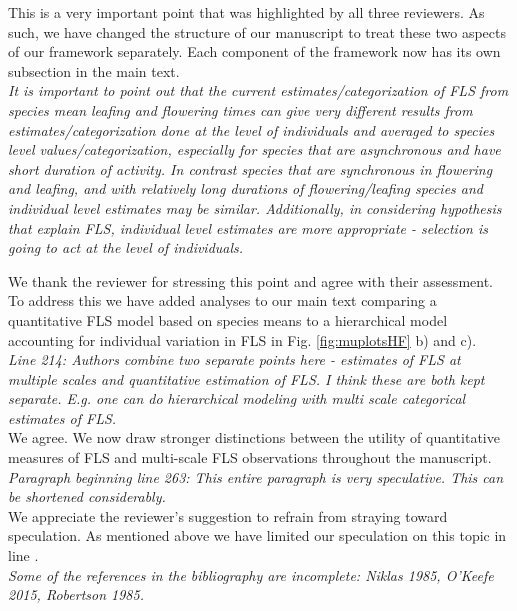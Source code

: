 \documentclass{article}[11pt]
\begin{document}
\noindent This is a very important point that was highlighted by all three reviewers. As such, we have changed the structure of our manuscript to treat these two aspects of our framework separately. Each component of the framework now has its own subsection in the main text.\\

\emph{It is important to point out that the current estimates/categorization of FLS from species mean leafing and flowering times can give very different results from estimates/categorization done at the level of individuals and averaged to species level values/categorization, especially for species that are asynchronous and have short duration of activity. In contrast species that are synchronous in flowering and leafing, and with relatively long durations of flowering/leafing species and individual level estimates may be similar. Additionally, in considering hypothesis that explain FLS, individual level estimates are more appropriate - selection is going to act at the level of individuals.}

\noindent We thank the reviewer for stressing this point and agree with their assessment. To address this we have added analyses to our main text comparing a quantitative FLS model based on species means to a hierarchical model accounting for individual variation in FLS in Fig.  \ref{fig:muplotsHF} b) and c).\\

\emph{Line 214: Authors combine two separate points here - estimates of FLS at multiple scales and quantitative estimation of FLS. I think these are both kept separate. E.g. one can do hierarchical modeling with  multi scale categorical estimates of FLS.}\\

\noindent We agree. We now draw stronger distinctions between the utility of quantitative measures of FLS and multi-scale FLS observations throughout the manuscript.\\ 

\emph{Paragraph beginning line 263: This entire paragraph is very speculative. This can be shortened considerably.}\\

\noindent We appreciate the reviewer's suggestion to refrain from straying toward speculation. As mentioned above we have limited our speculation on this topic in line . \\

\emph{Some of the references in the bibliography are incomplete: Niklas 1985, O'Keefe 2015,  Robertson 1985.}\\
 
\end{document}
